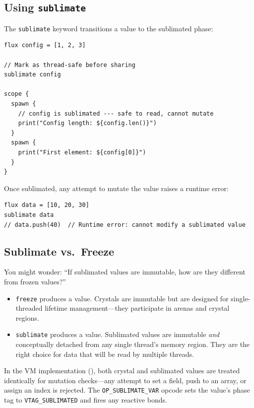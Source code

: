 \subsection{Using \texttt{sublimate}}

The \lstinline|sublimate| keyword transitions a value to the sublimated phase:

\begin{lstlisting}[language=Lattice, caption={Sublimating a value}]
flux config = [1, 2, 3]

// Mark as thread-safe before sharing
sublimate config

scope {
  spawn {
    // config is sublimated --- safe to read, cannot mutate
    print("Config length: ${config.len()}")
  }
  spawn {
    print("First element: ${config[0]}")
  }
}
\end{lstlisting}

Once sublimated, any attempt to mutate the value raises a runtime error:

\begin{lstlisting}[language=Lattice, caption={Sublimated values cannot be mutated}]
flux data = [10, 20, 30]
sublimate data
// data.push(40)  // Runtime error: cannot modify a sublimated value
\end{lstlisting}

\subsection{Sublimate vs.\ Freeze}

You might wonder: ``If sublimated values are immutable, how are they different from frozen values?''

\begin{itemize}
  \item \lstinline|freeze| produces a  value. Crystals are immutable but are designed for single-threaded lifetime management---they participate in arenas and crystal regions.
  \item \lstinline|sublimate| produces a  value. Sublimated values are immutable \emph{and} conceptually detached from any single thread's memory region. They are the right choice for data that will be read by multiple threads.
\end{itemize}

In the VM implementation (), both crystal and sublimated values are treated identically for mutation checks---any attempt to set a field, push to an array, or assign an index is rejected.
The \texttt{OP\_SUBLIMATE\_VAR} opcode sets the value's phase tag to \texttt{VTAG\_SUBLIMATED} and fires any reactive bonds.

